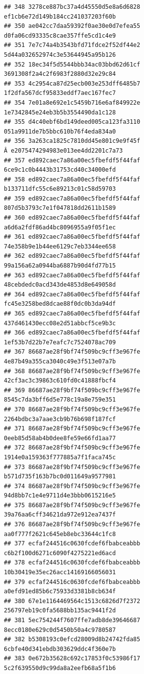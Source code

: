 \documentclass[]{article}
\begin{document}
\begin{verbatim}
## 348 3278ce887bc37a4d45550d5e8a6d6828   ef1cb6e72d149b184cc241037203f60b
## 350 ae042cc7daa59392f0ae30e0d7efea55   d0fa06cd93335c8cae357ffe5cd1c4e9
## 351 7e7c74a4b3543bfd71fdce2f52df44e2   5d44a032652974c3e53644945a95b126
## 352 18ec34f5d5544bbb34ac03bbd62d61cf   3691308f2a4c2f6983f2880d32e29c84
## 353 4c2954ca87d25ecb003e253dff6485b7   1f2dfa567dcf95833eddf7aec167fec7
## 354 7e01a8e692e1c5459b716e6af849922e   1e7342845e24eb3b5b3554490da1c128
## 355 d4c40ebf6bd149deed005ca123fa3110   051a9911de7b5bbc610b76f4eda834a0
## 356 3a263ca1825c7810dd45e801c9e9f45f Â e2075474294983e013ee4dd2201c7a73
## 357 ed892caec7a86a00ec5fbefdf5f44faf   6ce9c1c0b4443b31753cd40c34000efd
## 358 ed892caec7a86a00ec5fbefdf5f44faf   b133711dfc55c6e89213c01c58d59703
## 359 ed892caec7a86a00ec5fbefdf5f44faf   807d5b3793c7e1f047818dd2611b1589
## 360 ed892caec7a86a00ec5fbefdf5f44faf   a6d6a2fdf86ad4bc8096955a9f05f1ec
## 361 ed892caec7a86a00ec5fbefdf5f44faf   74e358b9e1b44ee6129c7eb3344ee658
## 362 ed892caec7a86a00ec5fbefdf5f44faf   99a156a62a0944ba6887b90d4fd77b15
## 363 ed892caec7a86a00ec5fbefdf5f44faf   48cebdedc0acd343de4853d8e649058d
## 364 ed892caec7a86a00ec5fbefdf5f44faf   fc45e3258bed8dcae88f0dc0b3da94df
## 365 ed892caec7a86a00ec5fbefdf5f44faf   437d461430ecc08e2d51abbcf5ce9b3c
## 366 ed892caec7a86a00ec5fbefdf5f44faf   1ef53b7d22b7e7eafc7c7524078ac709
## 367 86687ae28f9bf74f509bc9cff3e967fe   4e87b49a355ca3040c49e3f513e07a7b
## 368 86687ae28f9bf74f509bc9cff3e967fe   42cf3ac3c39863c610fd0c41888fbcf4
## 369 86687ae28f9bf74f509bc9cff3e967fe   8545c7da3bff6d5e778c19a8e759e351
## 370 86687ae28f9bf74f509bc9cff3e967fe   2264bdbc3a7aae3cb9b76b698f187fcf
## 371 86687ae28f9bf74f509bc9cff3e967fe   0eeb85d58ab4b0dee8fe59e66fd1aa77
## 372 86687ae28f9bf74f509bc9cff3e967fe   1914e0a159363f777885a7f1faca745c
## 373 86687ae28f9bf74f509bc9cff3e967fe   b571d735f163b7bc0d011649a9577981
## 374 86687ae28f9bf74f509bc9cff3e967fe   94d8bb7c1e4e9711d4e3bbb0615216e5
## 375 86687ae28f9bf74f509bc9cff3e967fe   39a76aa6cff34621da972e912ea7437f
## 376 86687ae28f9bf74f509bc9cff3e967fe   aa0f777f2621c645eb8ebc33644c1fc8
## 377 ecfaf244516c0630fcdef6fbabceabbb   c6b2f100d6271c6090f4275221ed6acd
## 378 ecfaf244516c0630fcdef6fbabceabbb   10b30419e35ec26acc14169166056031
## 379 ecfaf244516c0630fcdef6fbabceabbb   a0efd91ed85b6c75933d3381b8cb634f
## 380 67e1e1164469564c1513c6826d7f2372   256797eb19c0fa5688bb135ac9441f2d
## 381 5ec754244f7607ffe7adb8de39646687   8ecc0180e629c0d5450b50a4c9780587
## 382 b5308193c0efcd28009d8b24742fda85   6cbfe40d341ebdb303629ddc4f360e7b
## 383 0e672b35628c692c17853f0c53986f17   5c2f639550d9c99da8a2eefb68a5f1b6

\end{verbatim}
\end{document}
